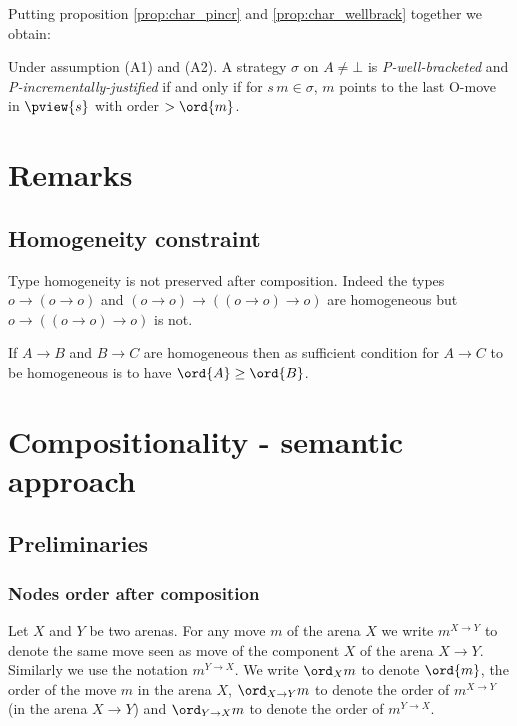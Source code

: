 Putting proposition \ref{prop:char_pincr} and
\ref{prop:char_wellbrack} together we obtain:
\begin{proposition}
Under assumption (A1) and (A2).
A strategy $\sigma$ on $A\neq \bot$
is \emph{P-well-bracketed} and
 \emph{P-incrementally-justified} if and only if
for $s \, m \in \sigma$, $m$ points to the last O-move in $\pview{s}$ with order $>\ord{m}$.
\end{proposition}


\section{Remarks}
\subsection{Homogeneity constraint}

Type homogeneity is not preserved after composition. Indeed the types  $o \longrightarrow (o \rightarrow o)$ and $(o \rightarrow o) \longrightarrow \left((o \rightarrow o) \rightarrow o \right)$ are homogeneous
but $o \longrightarrow \left((o \rightarrow o) \rightarrow o\right)$ is not.

If $A\rightarrow B$ and $B \rightarrow C$ are homogeneous then 
as sufficient condition for $A\rightarrow C$ to be homogeneous is to have $\ord{A} \geq \ord{B}$.


\section{Compositionality - semantic approach}

\subsection{Preliminaries}
 
\subsubsection{Nodes order after composition}

Let $X$ and $Y$ be two arenas.
For any move $m$ of the arena $X$ we write $m^{X\rightarrow Y}$ to denote the same move seen as move of the component $X$ of the arena $X\rightarrow Y$.
Similarly we use the notation $m^{Y\rightarrow X}$.
We write $\ord_X{m}$ to denote $\ord{m}$, the order of the move $m$ in the arena $X$, $\ord_{X\rightarrow Y}{m}$ to denote the order of $m^{X\rightarrow Y}$ (in the arena $X\rightarrow Y$) and $\ord_{Y\rightarrow X}{m}$ to denote the order of $m^{Y\rightarrow X}$.


